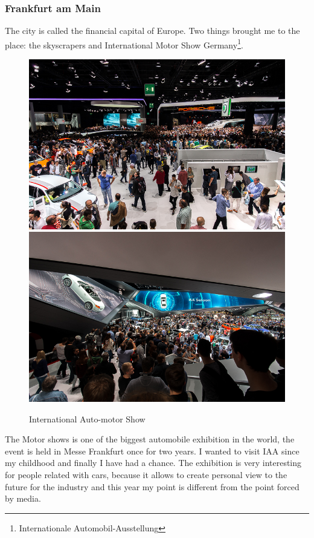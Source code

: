 \documentclass[english]{article}
\begin{document}
\subsubsection{Frankfurt am Main}
The city is called the financial capital of Europe. Two things brought me to the place: the skyscrapers and International Motor Show Germany\footnote{Internationale Automobil-Ausstellung }.\\
\begin{figure}
\includegraphics[scale=0.33]{Germany_travel/iaa1}\includegraphics[scale=0.33]{Germany_travel/iaa2}
\caption{International Auto-motor Show}
\end{figure}

The Motor shows is one of the biggest automobile exhibition in the world, the event is held in Messe Frankfurt once for two years. I wanted to visit IAA since my childhood and finally I have had a chance. The exhibition is very interesting for people related with cars, because it allows to create personal view to the future for the industry and this year my point is different from the point forced by media.\\
\end{document}
